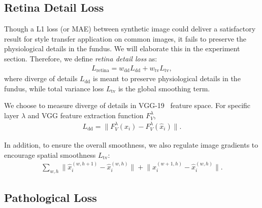 \documentclass[letterpaper]{article} %
\begin{document}
	
	
	
	
	
	
	\subsection{Retina Detail Loss}
    \label{sec:retina_detail}
    
    Though a  L1 loss (or MAE) between synthetic image could deliver a satisfactory result for style transfer application on common images, it fails to preserve the physiological details in the fundus. We will elaborate this in the experiment section. Therefore, we define \emph{retina detail loss} as:
	\begin{align}
	\label{align_retina_loss} 
	L_\mathrm{retina} = w_\mathrm{dd} L_\mathrm{dd} + w_\mathrm{tv} L_\mathrm{tv},
	\end{align}
	where diverge of details $L_\mathrm{dd}$ is meant to preserve physiological details in the fundus, while total variance loss $L_\mathrm{tv}$ is the global smoothing term.
	
		We choose to measure diverge of details in VGG-19~\cite{DBLP:journals/corr/SimonyanZ14a} feature space. For specific layer $ \lambda $ and VGG feature extraction function $ F_V^\lambda $,
	\begin{align}
	\label{align_dd_loss} 
	L_\mathrm{dd} =  {\lVert F_V^\lambda(x_i) - F_V^\lambda(\hat x_i) \lVert}.
	\end{align}
	
	In addition, to ensure the overall smoothness, we also regulate image gradients to encourage spatial smoothness $L_\mathrm{tv}$:
	\begin{align}
	\label{align_tv_loss} \textstyle
	\sum_{w,h}{\lVert \hat{x}_i^{(w,h+1)} - \hat{x}_i^{(w,h)} \lVert}
	+ {\lVert \hat{x}_i^{(w+1,h)} - \hat{x}_i^{(w,h)} \lVert}.
	\end{align}
	
	\subsection{Pathological Loss}
   
\end{document}
